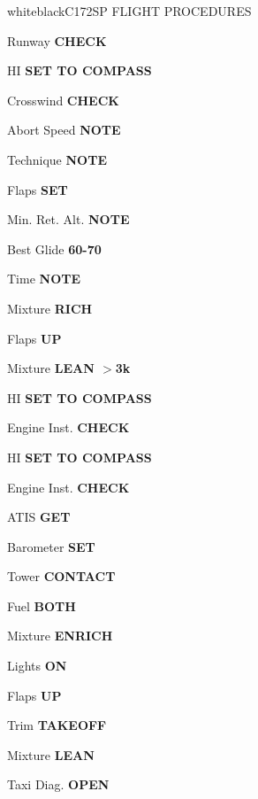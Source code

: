 \documentclass{article}
\begin{document}
\begin{groupheading}{white}{black}{C172SP FLIGHT PROCEDURES}
\end{groupheading}
\begin{multicols*}{3}

\colorbox{green!80!red}{}

Runway \dotfill \textbf{CHECK}

HI \dotfill \textbf{SET TO COMPASS}

Crosswind \dotfill \textbf{CHECK}

Abort Speed \dotfill \textbf{NOTE}

Technique \dotfill \textbf{NOTE}

Flaps \dotfill \textbf{SET}

Min. Ret. Alt. \dotfill \textbf{NOTE}

Best Glide \dotfill \textbf{60-70}

Time \dotfill \textbf{NOTE}

Mixture \dotfill \textbf{RICH}

\colorbox{green!80!red}{}

Flaps \dotfill \textbf{UP}

Mixture \dotfill \textbf{LEAN $>$3k}

HI \dotfill \textbf{SET TO COMPASS}

Engine Inst. \dotfill \textbf{CHECK}

\colorbox{green!80!red}{}

HI \dotfill \textbf{SET TO COMPASS}

Engine Inst. \dotfill \textbf{CHECK}

ATIS \dotfill \textbf{GET}

Barometer \dotfill \textbf{SET}

Tower \dotfill \textbf{CONTACT}

Fuel \dotfill \textbf{BOTH}

Mixture \dotfill \textbf{ENRICH}

Lights \dotfill \textbf{ON}

\colorbox{green!80!red}{}

Flaps \dotfill \textbf{UP}

Trim \dotfill \textbf{TAKEOFF}

Mixture \dotfill \textbf{LEAN}

Taxi Diag. \dotfill \textbf{OPEN}


\end{multicols*}
\end{document}
